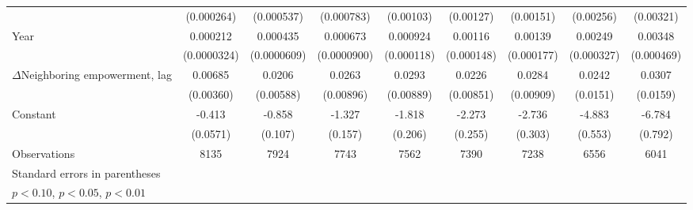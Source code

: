 \begin{table}[htbp]
\begin{tabular}{l*{8}{c}}
                    &  (0.000264)         &  (0.000537)         &  (0.000783)         &   (0.00103)         &   (0.00127)         &   (0.00151)         &   (0.00256)         &   (0.00321)         \\
[1em]
Year                &    0.000212\sym{***}&    0.000435\sym{***}&    0.000673\sym{***}&    0.000924\sym{***}&     0.00116\sym{***}&     0.00139\sym{***}&     0.00249\sym{***}&     0.00348\sym{***}\\
                    & (0.0000324)         & (0.0000609)         & (0.0000900)         &  (0.000118)         &  (0.000148)         &  (0.000177)         &  (0.000327)         &  (0.000469)         \\
[1em]
$\Delta$Neighboring empowerment, lag&     0.00685\sym{*}  &      0.0206\sym{***}&      0.0263\sym{***}&      0.0293\sym{***}&      0.0226\sym{***}&      0.0284\sym{***}&      0.0242         &      0.0307\sym{*}  \\
                    &   (0.00360)         &   (0.00588)         &   (0.00896)         &   (0.00889)         &   (0.00851)         &   (0.00909)         &    (0.0151)         &    (0.0159)         \\
[1em]
Constant            &      -0.413\sym{***}&      -0.858\sym{***}&      -1.327\sym{***}&      -1.818\sym{***}&      -2.273\sym{***}&      -2.736\sym{***}&      -4.883\sym{***}&      -6.784\sym{***}\\
                    &    (0.0571)         &     (0.107)         &     (0.157)         &     (0.206)         &     (0.255)         &     (0.303)         &     (0.553)         &     (0.792)         \\
\hline
Observations        &        8135         &        7924         &        7743         &        7562         &        7390         &        7238         &        6556         &        6041         \\
\hline\hline
\multicolumn{9}{l}{\footnotesize Standard errors in parentheses}\\
\multicolumn{9}{l}{\footnotesize \sym{*} \(p<0.10\), \sym{**} \(p<0.05\), \sym{***} \(p<0.01\)}\\
\end{tabular}
\end{table}
